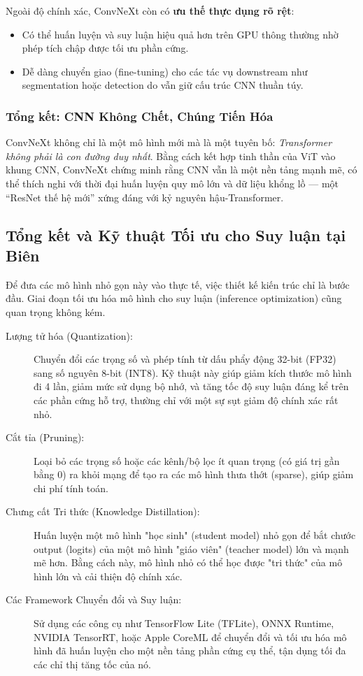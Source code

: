 Ngoài độ chính xác, ConvNeXt còn có \textbf{ưu thế thực dụng rõ rệt}:
\begin{itemize}
	\item Có thể huấn luyện và suy luận hiệu quả hơn trên GPU thông thường nhờ phép tích chập được tối ưu phần cứng.
	\item Dễ dàng chuyển giao (fine-tuning) cho các tác vụ downstream như segmentation hoặc detection do vẫn giữ cấu trúc CNN thuần túy.
\end{itemize}

\subsubsection{Tổng kết: CNN Không Chết, Chúng Tiến Hóa}
ConvNeXt không chỉ là một mô hình mới mà là một tuyên bố: \textit{Transformer không phải là con đường duy nhất}.  
Bằng cách kết hợp tinh thần của ViT vào khung CNN, ConvNeXt chứng minh rằng CNN vẫn là một nền tảng mạnh mẽ, có thể thích nghi với thời đại huấn luyện quy mô lớn và dữ liệu khổng lồ — một “ResNet thế hệ mới” xứng đáng với kỷ nguyên hậu-Transformer.

\subsection{Tổng kết và Kỹ thuật Tối ưu cho Suy luận tại Biên}
\label{subsec:edge_summary_optimization}
Để đưa các mô hình nhỏ gọn này vào thực tế, việc thiết kế kiến trúc chỉ là bước đầu. Giai đoạn tối ưu hóa mô hình cho suy luận (inference optimization) cũng quan trọng không kém.
\begin{description}
	\item[Lượng tử hóa (Quantization):] Chuyển đổi các trọng số và phép tính từ dấu phẩy động 32-bit (FP32) sang số nguyên 8-bit (INT8). Kỹ thuật này giúp giảm kích thước mô hình đi 4 lần, giảm mức sử dụng bộ nhớ, và tăng tốc độ suy luận đáng kể trên các phần cứng hỗ trợ, thường chỉ với một sự sụt giảm độ chính xác rất nhỏ.
	\item[Cắt tỉa (Pruning):] Loại bỏ các trọng số hoặc các kênh/bộ lọc ít quan trọng (có giá trị gần bằng 0) ra khỏi mạng để tạo ra các mô hình thưa thớt (sparse), giúp giảm chi phí tính toán.
	\item[Chưng cất Tri thức (Knowledge Distillation):] Huấn luyện một mô hình "học sinh" (student model) nhỏ gọn để bắt chước output (logits) của một mô hình "giáo viên" (teacher model) lớn và mạnh mẽ hơn. Bằng cách này, mô hình nhỏ có thể học được "tri thức" của mô hình lớn và cải thiện độ chính xác.
	\item[Các Framework Chuyển đổi và Suy luận:] Sử dụng các công cụ như TensorFlow Lite (TFLite), ONNX Runtime, NVIDIA TensorRT, hoặc Apple CoreML để chuyển đổi và tối ưu hóa mô hình đã huấn luyện cho một nền tảng phần cứng cụ thể, tận dụng tối đa các chỉ thị tăng tốc của nó.
\end{description}

